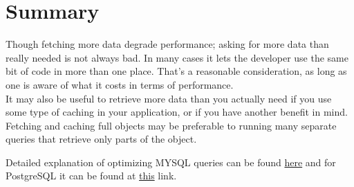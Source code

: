 \documentclass[paper=letter, fontsize=12pt]{article}
\begin{document}
\section{Summary}
Though fetching more data degrade performance; asking for more data than really needed is not always bad. In many cases it lets the developer use the same bit of code in more than one place. That’s a reasonable consideration, as long as one is aware of what it costs in terms of performance. 
\\It may also be useful to retrieve more data than you actually need if you use some type of caching in your application, or if you have another benefit in mind. Fetching and caching full objects may be preferable to running many separate queries that retrieve only parts of the object.

Detailed explanation of optimizing MYSQL queries can be found \href{https://www.oreilly.com/library/view/high-performance-mysql/9780596101718/ch04.html}{here} and for PostgreSQL it can be found at \href{https://wiki.postgresql.org/wiki/Introduction_to_VACUUM,_ANALYZE,_EXPLAIN,_and_COUNT}{this} link.
\end{document}
